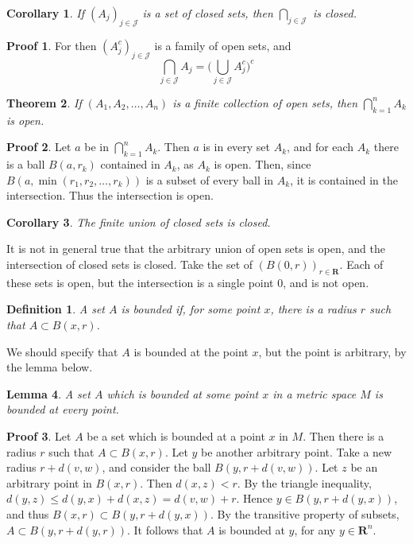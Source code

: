 \documentclass[12pt]{amsbook}
\theoremstyle{plain}
\newtheorem{definition}{Definition}
\newtheorem{theorem}{Theorem}
\newtheorem{lemma}[theorem]{Lemma}
\newtheorem{corollary}[theorem]{Corollary}
\theoremstyle{definition}
\newtheorem*{prf}{Proof}
\begin{document}
\begin{corollary}
  If $(A_j)_{j \in \mathcal{J}}$ is a set of closed sets, then $\bigcap_{j \in \mathcal{J}}$ is closed.
\end{corollary}
\begin{prf}
  For then $(A_j^c)_{j \in \mathcal{J}}$ is a family of open sets, and
  \[ \bigcap_{j \in \mathcal{J}} A_j = \bigg( \bigcup_{j \in \mathcal{J}} A_j^c \bigg)^c \]
\end{prf}

\begin{theorem}
  If $(A_1, A_2, \dots, A_n)$ is a finite collection of open sets, then $\bigcap_{k = 1}^n A_k$ is open.
\end{theorem}
\begin{prf}
  Let $a$ be in $\bigcap_{k = 1}^n A_k$. Then $a$ is in every set $A_k$, and for each $A_k$ there is a ball $B(a,r_k)$ contained in $A_k$, as $A_k$ is open. Then, since $B(a,\min(r_1,r_2, \dots, r_k))$ is a subset of every ball in $A_k$, it is contained in the intersection. Thus the intersection is open.
\end{prf}

\begin{corollary}
  The finite union of closed sets is closed.
\end{corollary}

It is not in general true that the arbitrary union of open sets is open, and the intersection of closed sets is closed. Take the set of $(B(0,r))_{r \in \mathbf{R}}$. Each of these sets is open, but the intersection is a single point 0, and is not open.

\begin{definition}
  A set $A$ is bounded if, for some point $x$, there is a radius $r$ such that $A \subset B(x,r)$.
\end{definition}

We should specify that $A$ is bounded at the point $x$, but the point is arbitrary, by the lemma below.

\begin{lemma}
  A set $A$ which is bounded at some point $x$ in a metric space $M$ is bounded at every point.
\end{lemma}
\begin{prf}
  Let $A$ be a set which is bounded at a point $x$ in $M$. Then there is a radius $r$ such that $A \subset B(x,r)$. Let $y$ be another arbitrary point. Take a new radius $r + d(v,w)$, and consider the ball $B(y,r + d(v, w))$. Let $z$ be an arbitrary point in $B(x,r)$. Then $d(x, z) < r$. By the triangle inequality, $d(y, z) \leq d(y, x) + d(x, z) = d(v, w) + r$. Hence $y \in B(y,r + d(y, x))$, and thus $B(x,r) \subset B(y,r + d(y, x))$. By the transitive property of subsets, $A \subset B(y,r + d(y, r))$. It follows that $A$ is bounded at $y$, for any $y \in \mathbf{R}^n$.
\end{prf}
\end{document}

